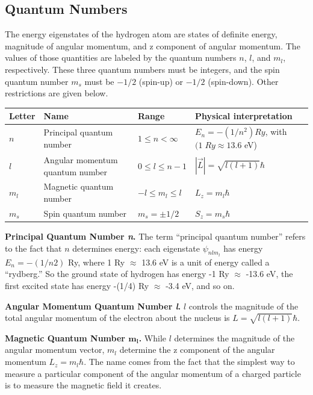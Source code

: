 \documentclass[../../main.tex]{subfiles}
\begin{document}
\subsection{Quantum Numbers}
The energy eigenstates of the hydrogen atom are states of definite energy, magnitude of angular momentum, and z component of angular momentum. The values of those quantities are labeled by the quantum numbers $n$, $l$, and $m_l$, respectively. These three quantum numbers must be integers, and the spin quantum number $m_s$ must be $-1/2$ (spin-up) or $-1/2$ (spin-down). Other restrictions are given below.
\begin{center}
    \begin{tabular}{| p{} | p{} | p{} | p{}|}
        \hline
        Letter&Name&Range&Physical interpretation\\
        \hline
        $n$&Principal quantum number&$1 \leq n <\infty$&$E_n = -(1/n^2) Ry$, with $ (1 \;Ry \approx 13.6$ eV)\\
        $l$&Angular momentum quantum number&$0 \leq l \leq n - 1$ &$ |\overrightarrow{L}| = \sqrt{l(l + 1) }\hbar$\\
        $m_l$&Magnetic quantum number&$-l \leq m_l \leq l$&$L_z = m_l\hbar$\\
        $m_s$&Spin quantum number&$m_s = \pm 1/2$&$S_z = m_s\hbar$\\\hline
    \end{tabular}
\end{center}

\textbf{Principal Quantum Number \emph{n}.} The term “principal quantum number” refers to the fact that $n$ determines energy: each eigenstate $\psi_{nlm_l}$  has energy $E_n = -(1/n2)$ Ry, where 1 Ry $\approx$ 13.6 eV is a unit of energy called a “rydberg.” So the ground state of hydrogen has energy -1 Ry $\approx$ -13.6 eV, the first excited state has energy -(1/4) Ry $\approx$ -3.4 eV, and so on.

\textbf{Angular Momentum Quantum Number \emph{l}.} $l$ controls the magnitude of the total angular momentum of the electron about the nucleus is $L = \sqrt{l(l + 1)} \hbar$.

\textbf{Magnetic Quantum Number $\boldsymbol{m_l}$.}  While $l$ determines the magnitude of the angular momentum vector, $m_l$ determine the z component of the angular momentum $L_z = m_l \hbar$. The name comes from the fact that the simplest way to measure a particular component of the angular momentum of a charged particle is to measure the magnetic field it creates.
\end{document}
